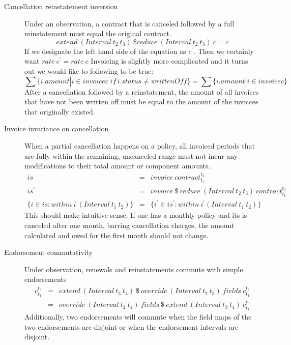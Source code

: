 \begin{description}

\item[Cancellation reinstatement inversion]
Under an observation, a contract that is canceled followed by a full reinstatement must
equal the original contract.
\begin{equation*}
extend \: (Interval \: t_2 \: t_3) \: \$ reduce \: (Interval \: t_2 \: t_3) \: c = c
\end{equation*}
If we designate the left hand side of the equation as $c^\prime$. Then we certainly want $rate \: c^\prime = rate \: c$
Invoicing is slightly more complicated and it turns out we would like to following to be true:
\begin{equation*}
\sum \{i.amount | i \in invoice c^\prime if \, i.status \neq writtenOff\} = \sum \{i.amount | i \in invoice c\}
\end{equation*}
After a cancellation followed by a reinstatement, the amount of all invoices that have not been written off must be equal
to the amount of the invoices that originally existed.

\item[Invoice invariance on cancellation]
When a partial cancellation happens on a policy, all invoiced periods that are fully within the remaining,
uncanceled range must not incur any modifications to their total amount or component amounts.
\begin{eqnarray*}
is & = & invoice \: contract_{t_1}^{t_3} \\
is^\prime & = & invoice \: \$ \: reduce \: (Interval \: t_2 \: t_3) \: contract_{t_1}^{t_3} \\
\{i \in is : within \: i \: (Interval \: t_1 \: t_2)\} & = & \{i^\prime \in is^\prime : within \: i^\prime (Interval \: t_1 \: t_2)\}
\end{eqnarray*}
This should make intuitive sense. If one has a monthly policy and its is canceled after one month, barring cancellation charges,
the amount calculated and owed for the first month should not change.

\item[Endorsement commutativity] Under observation, renewals and reinstatements commute with simple endorsements
\begin{eqnarray*}
c_{t_1}^{t_4} & = & extend \: (Interval \: t_3 \: t_4) \: \$ \: override \: (Interval \: t_2 \: t_3) \: fields \: c_{t_1}^{t_3} \\
            & = & override \: (Interval \: t_2 \: t_4) \: fields \: \$ \: extend \: (Interval \: t_3 \: t_4) \: c_{t_1}^{t_3}
\end{eqnarray*}
Additionally, two endorsements will commute when the field maps of the two endorsements are disjoint or when the endorsement intervals are
disjoint.

\end{description}

